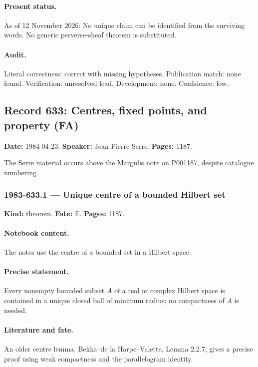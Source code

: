 \paragraph{Present status.} As of 12 November 2026: No unique claim can be identified from the surviving words. No generic perverse-sheaf theorem is substituted.

\paragraph{Audit.} Literal correctness: correct with missing hypotheses. Publication match: none found. Verification: unresolved lead. Development: none. Confidence: low.

\subsection{Record 633: Centres, fixed points, and property (FA)}

\label{talk:633}

\noindent\textbf{Date:} 1984-04-23. \textbf{Speaker:} Jean-Pierre Serre. \textbf{Pages:} 1187.\par

The Serre material occurs above the Margulis note on P001187, despite catalogue numbering.

\subsubsection{1983-633.1 --- Unique centre of a bounded Hilbert set}

\label{item:1983-633.1}

\noindent\textbf{Kind:} theorem. \textbf{Fate:} E. \textbf{Pages:} 1187.\par

\paragraph{Notebook content.} The notes use the centre of a bounded set in a Hilbert space.

\paragraph{Precise statement.} Every nonempty bounded subset \(A\) of a real or complex Hilbert space is contained in a unique closed ball of minimum radius; no compactness of \(A\) is needed.

\paragraph{Literature and fate.} An older centre lemma. Bekka--de la Harpe--Valette, Lemma 2.2.7, gives a precise proof using weak compactness and the parallelogram identity.

